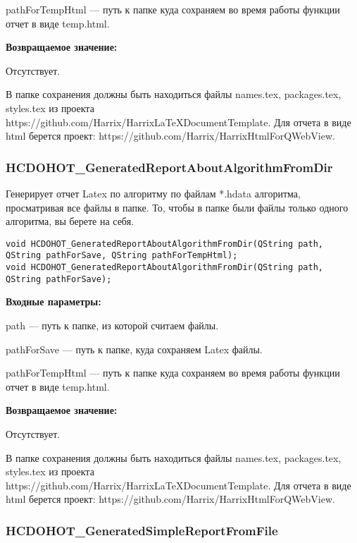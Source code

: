 \documentclass[a4paper,12pt]{article}
\begin{document}
    pathForTempHtml --- путь к папке куда сохраняем во время работы функции отчет в виде temp.html.

\textbf{Возвращаемое значение:}

Отсутствует.

В папке сохранения должны быть находиться файлы names.tex, packages.tex, styles.tex из проекта https://github.com/Harrix/HarrixLaTeXDocumentTemplate. Для отчета в виде html берется проект: https://github.com/Harrix/HarrixHtmlForQWebView.


\subsubsection{HCDOHOT\_GeneratedReportAboutAlgorithmFromDir}\label{HCDOHOT_GeneratedReportAboutAlgorithmFromDir}

Генерирует отчет Latex по алгоритму по файлам *.hdata алгоритма, просматривая все файлы в папке. То, чтобы в папке были файлы только одного алгоритма, вы берете на себя.


\begin{lstlisting}[label=code_syntax_HCDOHOT_GeneratedReportAboutAlgorithmFromDir,caption=Синтаксис]
void HCDOHOT_GeneratedReportAboutAlgorithmFromDir(QString path, QString pathForSave, QString pathForTempHtml);
void HCDOHOT_GeneratedReportAboutAlgorithmFromDir(QString path, QString pathForSave);
\end{lstlisting}

\textbf{Входные параметры:}

path --- путь к папке, из которой считаем файлы.
 
    pathForSave --- путь к папке, куда сохраняем Latex файлы.
 
    pathForTempHtml --- путь к папке куда сохраняем во время работы функции отчет в виде temp.html.

\textbf{Возвращаемое значение:}

Отсутствует.

В папке сохранения должны быть находиться файлы names.tex, packages.tex, styles.tex из проекта https://github.com/Harrix/HarrixLaTeXDocumentTemplate. Для отчета в виде html берется проект: https://github.com/Harrix/HarrixHtmlForQWebView.


\subsubsection{HCDOHOT\_GeneratedSimpleReportFromFile}\label{HCDOHOT_GeneratedSimpleReportFromFile}
\end{document}

